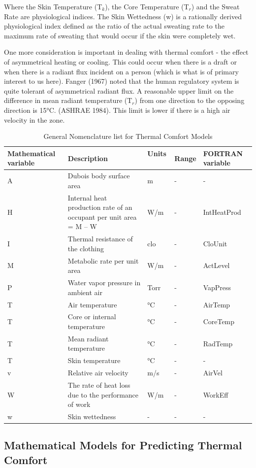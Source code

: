 Where the Skin Temperature (T\(_{k}\)), the Core Temperature (T\(_{r}\)) and the Sweat Rate are physiological indices. The Skin Wettedness (w) is a rationally derived physiological index defined as the ratio of the actual sweating rate to the maximum rate of sweating that would occur if the skin were completely wet.

One more consideration is important in dealing with thermal comfort - the effect of asymmetrical heating or cooling. This could occur when there is a draft or when there is a radiant flux incident on a person (which is what is of primary interest to us here). Fanger (1967) noted that the human regulatory system is quite tolerant of asymmetrical radiant flux. A reasonable upper limit on the difference in mean radiant temperature (T\(_{r}\)) from one direction to the opposing direction is 15°C. (ASHRAE 1984). This limit is lower if there is a high air velocity in the zone.

\begin{longtable}[c]{p{1.2in}p{1.2in}p{1.2in}p{1.2in}p{1.2in}}
\caption{  General Nomenclature list for Thermal Comfort Models \protect \label{table:general-nomenclature-list-for-thermal-comfort}}\\
\toprule 
Mathematical variable & Description & Units ~ & Range & FORTRAN variable \tabularnewline \midrule
\endhead
A & Dubois body surface area & m & - & - \tabularnewline
H & Internal heat production rate of an occupant per unit area = M – W & W/m & - & IntHeatProd \tabularnewline
I & Thermal resistance of the clothing & clo & - & CloUnit \tabularnewline
M & Metabolic rate per unit area & W/m & - & ActLevel \tabularnewline
P & Water vapor pressure in ambient air & Torr & - & VapPress \tabularnewline
T & Air temperature & °C & - & AirTemp \tabularnewline
T & Core or internal temperature & °C & - & CoreTemp \tabularnewline
T & Mean radiant temperature & °C & - & RadTemp \tabularnewline
T & Skin temperature & °C & - & - \tabularnewline
v & Relative air velocity & m/s & - & AirVel \tabularnewline
W & The rate of heat loss due to the performance of work & W/m & - & WorkEff \tabularnewline
w & Skin wettedness & - & - & - \tabularnewline
\bottomrule
\end{longtable}

\subsection{Mathematical Models for Predicting Thermal Comfort}\label{mathematical-models-for-predicting-thermal-comfort}

